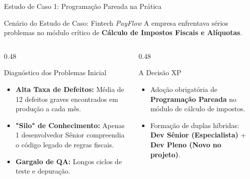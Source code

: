 \documentclass[aspectratio=169, 9pt]{beamer}
\begin{document}
\begin{frame}{Estudo de Caso 1: Programação Pareada na Prática}
  \begin{block}{Cenário do Estudo de Caso: Fintech \textit{PayFlow}}
    A empresa enfrentava sérios problemas no módulo crítico de \textbf{Cálculo de Impostos Fiscais e Alíquotas}.
  \end{block}

  \vspace{0.3cm}

  \begin{columns}[T]
    \begin{column}{0.48\textwidth}
      \begin{alertblock}{Diagnóstico dos Problemas Inicial}
        \begin{itemize}
          \item \textbf{Alta Taxa de Defeitos:} Média de 12 defeitos graves encontrados em produção a cada mês.
          \item \textbf{"Silo" de Conhecimento:} Apenas 1 desenvolvedor Sênior compreendia o código legado de regras fiscais.
          \item \textbf{Gargalo de QA:} Longos ciclos de teste e depuração.
        \end{itemize}
      \end{alertblock}
    \end{column}

    \begin{column}{0.48\textwidth}
      \begin{exampleblock}{A Decisão XP}
        \begin{itemize}
          \item Adoção obrigatória de \textbf{Programação Pareada} no módulo de cálculo de impostos.
          \item Formação de duplas híbridas: \textbf{Dev Sênior (Especialista)} + \textbf{Dev Pleno (Novo no projeto)}.
        \end{itemize}
      \end{exampleblock}
    \end{column}
  \end{columns}
\end{frame}
\end{document}
